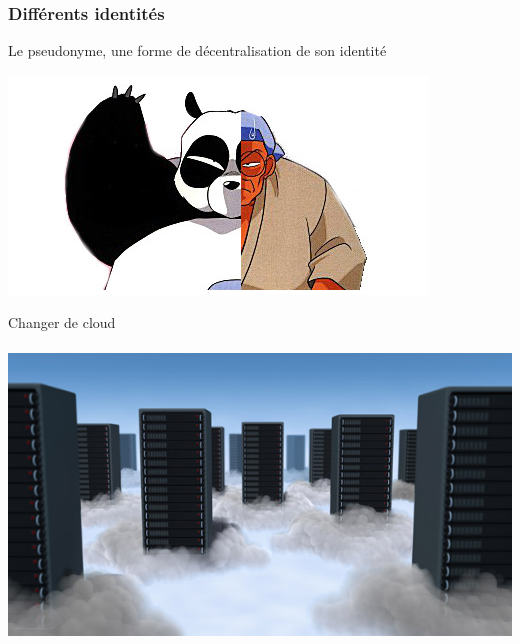 \documentclass{beamer}
\begin{document}
\begin{frame}
\frametitle{Différents identités}
\begin{block}{Le pseudonyme, une forme de décentralisation de son identité}
\end{block}
\begin{center}
\includegraphics[scale=0.4]{./images/bannierepseudonymat.jpg}
\end{center}
\end{frame}

\begin{frame}
\begin{center}
\Huge{Changer de cloud}
\\~\\
\includegraphics[scale=0.5] {./images/cloud_data_center.jpg}
\end{center}
\end{frame}
\end{document}
